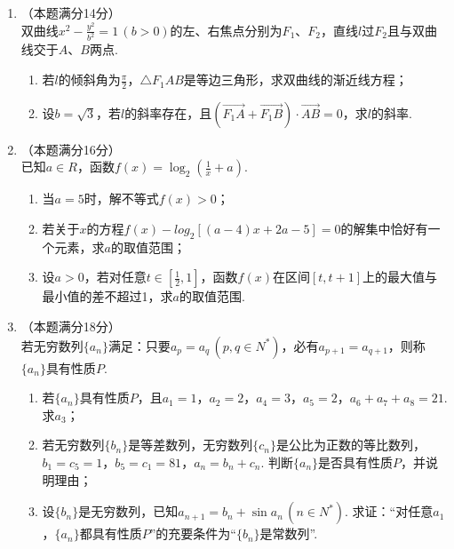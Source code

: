 \documentclass[12pt,space]{ctexart} %
\begin{document}
\begin{enumerate}[itemsep=-0.3em,topsep=0pt, resume]
    \item （本题满分14分）\\
    双曲线$\displaystyle{x^2-\frac{y^2}{b^2}=1\,(b>0)}$的左、右焦点分别为$F_1$、$F_2$，直线$l$过$F_2$且与双曲线交于$A$、$B$两点. 
    \begin{enumerate}[itemsep=-0.3em,label={(\arabic*)},topsep=0pt,labelsep=.5em,leftmargin=1.7em]
      \item 若$l$的倾斜角为$\displaystyle{\frac{\pi}{2}}$，$\triangle F_1AB$是等边三角形，求双曲线的渐近线方程；
      \item 设$b=\sqrt{3}$，若$l$的斜率存在，且$(\overrightarrow{F_1A}+\overrightarrow{F_1B})\cdot\overrightarrow{AB}=0$，求$l$的斜率.
    \end{enumerate}

    \item （本题满分16分）\\
    已知$a\in R$，函数$\displaystyle{f(x)=\log_2(\frac{1}{x}+a)}$.
    \begin{enumerate}[itemsep=-0.3em,label={(\arabic*)},topsep=0pt,labelsep=.5em,leftmargin=1.7em]
      \item 当$a=5$时，解不等式$f(x)>0$；
      \item 若关于$x$的方程$f(x)-log_2[(a-4)x+2a-5]=0$的解集中恰好有一个元素，求$a$的取值范围；
      \item 设$a>0$，若对任意$\displaystyle{t\in [\frac{1}{2}, 1]}$，函数$f(x)$在区间$[t, t+1]$上的最大值与最小值的差不超过1，求$a$的取值范围.
    \end{enumerate}

    \item （本题满分18分）\\
    若无穷数列$\{a_n\}$满足：只要$a_p=a_q\,(p,q\in N^*)$，必有$a_{p+1}=a_{q+1}$，则称$\{a_n\}$具有性质$P$.
    \begin{enumerate}[itemsep=-0.3em,label={(\arabic*)},topsep=0pt,labelsep=.5em,leftmargin=1.7em]
      \item 若$\{a_n\}$具有性质$P$，且$a_1=1$，$a_2=2$，$a_4=3$，$a_5=2$，$a_6+a_7+a_8=21$. 求$a_3$；
      \item 若无穷数列$\{b_n\}$是等差数列，无穷数列$\{c_n\}$是公比为正数的等比数列，$b_1=c_5=1$，$b_5=c_1=81$，$a_n=b_n+c_n$.
            判断$\{a_n\}$是否具有性质$P$，并说明理由；
      \item 设$\{b_n\}$是无穷数列，已知$a_{n+1}=b_n+\sin a_n\,(n\in N^*)$. 求证：“对任意$a_1$，$\{a_n\}$都具有性质$P$”的充要条件为“$\{b_n\}$是常数列”.
    \end{enumerate}

\end{enumerate}

\clearpage
\end{document}
